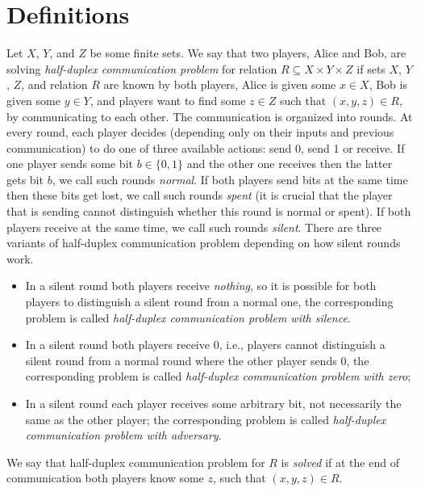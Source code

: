 \section{Definitions}\label{sec:defs}
\begin{definition}
Let $X$, $Y$, and $Z$ be some finite sets. We say that two players, Alice and Bob, are solving
\emph{half-duplex communication problem} for relation $R \subseteq X\times Y\times Z$ if sets $X$, $Y$, $Z$, and
relation $R$ are known by both players, Alice is given some $x\in X$, Bob is given some $y\in Y$,
and players want to find some $z\in Z$ such that $(x,y,z)\in R$, by communicating to each other. 
The communication is organized into rounds. At every round, each player decides 
(depending only on their inputs and previous communication) to
do one of three available actions: send 0, send 1 or receive.
If one player sends some bit $b\in\{0,1\}$ and the other one receives then the latter gets bit $b$, we
call such rounds \emph{normal}.
If both players send bits at the same time then these bits get lost, we call such rounds
\emph{spent} (it is crucial that the player that is sending cannot distinguish whether this round is normal or spent).
If both players receive at the same time, we call such rounds \emph{silent}.
There are three variants of half-duplex communication problem depending
on how silent rounds work.
\begin{itemize}
\item In a silent round both players receive \emph{nothing}, so it is possible for both players to distinguish
    a silent round from a normal one, the corresponding problem is called \emph{half-duplex communication problem with silence}.

\item In a silent round both players receive $0$, i.e., players cannot distinguish a silent round from a normal round where the other player sends $0$, the corresponding problem is called 
\emph{half-duplex communication problem with zero};

\item In a silent round each player receives some arbitrary bit, not necessarily the same as the other player; the corresponding problem is called \emph{half-duplex communication problem with adversary}.
\end{itemize}
We say that half-duplex communication problem for $R$ is \emph{solved} if at the end of communication both players know some $z$, such that $(x,y,z)\in R$.
\end{definition} 

